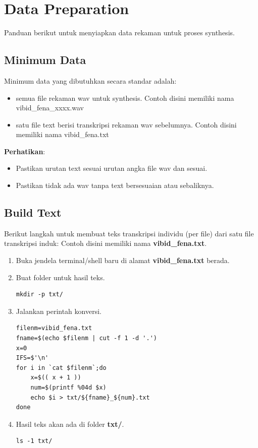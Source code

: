 \documentclass[12pt,]{article}
\begin{document}
	\newpage
	\section{Data Preparation}

	Panduan berikut untuk menyiapkan data rekaman untuk proses synthesis.

	\subsection{Minimum Data}

	Minimum data yang dibutuhkan secara standar adalah:
	\begin{itemize}
		\item semua file rekaman wav untuk synthesis.
		Contoh disini memiliki nama vibid\_fena\_xxxx.wav

		\item satu file text berisi transkripsi rekaman wav sebelumnya.
		Contoh disini memiliki nama vibid\_fena.txt
	\end{itemize}

	\textbf{Perhatikan}:
	\begin{itemize}
		\item Pastikan urutan text sesuai urutan angka file wav dan sesuai.
		\item Pastikan tidak ada wav tanpa text bersesuaian atau sebaliknya.
	\end{itemize}

	\subsection{Build Text}

	Berikut langkah untuk membuat teks transkripsi individu (per file) dari satu file transkripsi induk:
	Contoh disini memiliki nama \textbf{vibid\_fena.txt}.
	\begin{enumerate}
		\item Buka jendela terminal/shell baru di alamat \textbf{vibid\_fena.txt} berada.

		\item Buat folder untuk hasil teks.
		\begin{verbatim}
mkdir -p txt/
		\end{verbatim}

		\item Jalankan perintah konversi.
		\begin{verbatim}
filenm=vibid_fena.txt
fname=$(echo $filenm | cut -f 1 -d '.')
x=0
IFS=$'\n'
for i in `cat $filenm`;do
	x=$(( x + 1 ))
	num=$(printf %04d $x)
	echo $i > txt/${fname}_${num}.txt
done
		\end{verbatim}

		\item Hasil teks akan ada di folder \textbf{txt/}.
		\begin{verbatim}
ls -1 txt/
		\end{verbatim}

	\end{enumerate}
\end{document}
